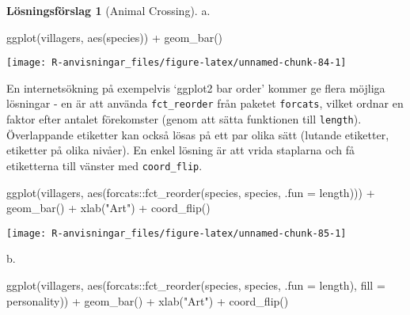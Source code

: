 \documentclass[
]{book}
\newenvironment{Shaded}{\begin{snugshade}}{\end{snugshade}}
\newcommand{\AttributeTok}[1]{\textcolor[rgb]{0.77,0.63,0.00}{#1}}
\newcommand{\FunctionTok}[1]{\textcolor[rgb]{0.00,0.00,0.00}{#1}}
\newcommand{\NormalTok}[1]{#1}
\newcommand{\SpecialCharTok}[1]{\textcolor[rgb]{0.00,0.00,0.00}{#1}}
\newcommand{\StringTok}[1]{\textcolor[rgb]{0.31,0.60,0.02}{#1}}
\theoremstyle{definition}
\theoremstyle{definition}
\theoremstyle{definition}
\theoremstyle{definition}
\newtheorem{hypothesis}{Lösningsförslag}[chapter]
\theoremstyle{remark}
\begin{document}
\begin{hypothesis}[Animal Crossing]
a.

\begin{Shaded}
\begin{Highlighting}[]
\FunctionTok{ggplot}\NormalTok{(villagers, }\FunctionTok{aes}\NormalTok{(species)) }\SpecialCharTok{+}
  \FunctionTok{geom\_bar}\NormalTok{()}
\end{Highlighting}
\end{Shaded}

\begin{center}\texttt{[image: R-anvisningar\_files/figure-latex/unnamed-chunk-84-1]} \end{center}

En internetsökning på exempelvis `ggplot2 bar order' kommer ge flera möjliga lösningar - en är att använda \texttt{fct\_reorder} från paketet \texttt{forcats}, vilket ordnar en faktor efter antalet förekomster (genom att sätta funktionen till \texttt{length}).
Överlappande etiketter kan också lösas på ett par olika sätt (lutande etiketter, etiketter på olika nivåer). En enkel lösning är att vrida staplarna och få etiketterna till vänster med \texttt{coord\_flip}.

\begin{Shaded}
\begin{Highlighting}[]
\FunctionTok{ggplot}\NormalTok{(villagers, }\FunctionTok{aes}\NormalTok{(forcats}\SpecialCharTok{::}\FunctionTok{fct\_reorder}\NormalTok{(species, species, }\AttributeTok{.fun =}\NormalTok{ length))) }\SpecialCharTok{+}
  \FunctionTok{geom\_bar}\NormalTok{() }\SpecialCharTok{+}
  \FunctionTok{xlab}\NormalTok{(}\StringTok{"Art"}\NormalTok{) }\SpecialCharTok{+}
  \FunctionTok{coord\_flip}\NormalTok{()}
\end{Highlighting}
\end{Shaded}

\begin{center}\texttt{[image: R-anvisningar\_files/figure-latex/unnamed-chunk-85-1]} \end{center}

b.

\begin{Shaded}
\begin{Highlighting}[]
\FunctionTok{ggplot}\NormalTok{(villagers, }\FunctionTok{aes}\NormalTok{(forcats}\SpecialCharTok{::}\FunctionTok{fct\_reorder}\NormalTok{(species, species, }\AttributeTok{.fun =}\NormalTok{ length), }\AttributeTok{fill =}\NormalTok{ personality)) }\SpecialCharTok{+}
  \FunctionTok{geom\_bar}\NormalTok{() }\SpecialCharTok{+}
  \FunctionTok{xlab}\NormalTok{(}\StringTok{"Art"}\NormalTok{) }\SpecialCharTok{+}
  \FunctionTok{coord\_flip}\NormalTok{()}
\end{Highlighting}
\end{Shaded}


\end{hypothesis}
\end{document}
